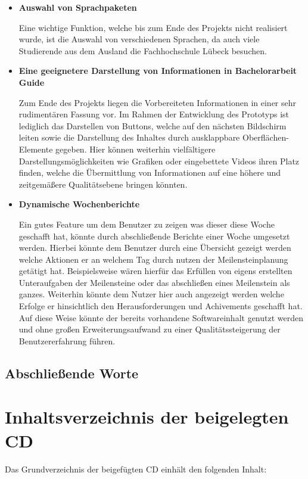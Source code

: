 \documentclass[bibliography=totoc,listof=totoc,BCOR=5mm,DIV=12,oneside]{scrbook}
\begin{document}
{\begin{itemize}
\item \textbf{Auswahl von Sprachpaketen}
\par Eine wichtige Funktion, welche bis zum Ende des Projekts nicht realisiert wurde, ist die Auswahl von verschiedenen Sprachen, da auch viele Studierende aus dem Ausland die Fachhochschule Lübeck besuchen.

\item \textbf{Eine geeignetere Darstellung von Informationen in Bachelorarbeit Guide}
\par Zum Ende des Projekts liegen die Vorbereiteten Informationen in einer sehr rudimentären Fassung vor. Im Rahmen der Entwicklung des Prototyps ist lediglich das Darstellen von Buttons, welche auf den nächsten Bildschirm leiten sowie die Darstellung des Inhaltes durch ausklappbare Oberflächen-Elemente gegeben. Hier können weiterhin vielfältigere Darstellungsmöglichkeiten wie Grafiken oder eingebettete Videos ihren Platz finden, welche die Übermittlung von Informationen auf eine höhere und zeitgemäßere Qualitätsebene bringen könnten.

\item \textbf{Dynamische Wochenberichte}
\par Ein gutes Feature um dem Benutzer zu zeigen was dieser diese Woche geschafft hat, könnte durch abschließende Berichte einer Woche umgesetzt werden. Hierbei könnte dem Benutzer durch eine Übersicht gezeigt werden welche Aktionen er an welchem Tag durch nutzen der Meilensteinplanung getätigt hat. Beispielsweise wären hierfür das Erfüllen von eigens erstellten Unteraufgaben der Meilensteine oder das abschließen eines Meilenstein als ganzes. Weiterhin könnte dem Nutzer hier auch angezeigt werden welche Erfolge er hinsichtlich den Herausforderungen und Achivements geschafft hat. Auf diese Weise könnte der bereits vorhandene Softwareinhalt genutzt werden und ohne großen Erweiterungsaufwand zu einer Qualitätssteigerung der Benutzererfahrung führen.
\end{itemize}

\section{Abschließende Worte}

\listoffigures
\listoftables
\lstlistoflistings


\chapter*{Inhaltsverzeichnis der beigelegten CD}
\par Das Grundverzeichnis der beigefügten CD einhält den folgenden Inhalt:

}
\end{document}
